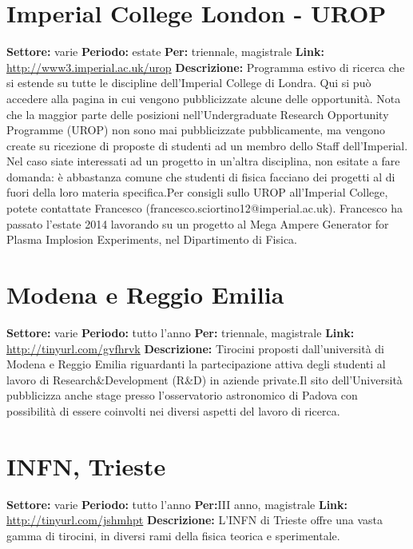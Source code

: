 \documentclass[a4paper,10pt]{article}
\begin{document}
\section{Imperial College London - UROP}

\textbf{Settore:} varie\newline
\textbf{Periodo:} estate\newline
\textbf{Per:} triennale, magistrale\newline
\textbf{Link:} \url{http://www3.imperial.ac.uk/urop} \newline
\textbf{Descrizione:}  Programma estivo di ricerca che si estende su tutte le discipline dell’Imperial College di Londra. Qui si può accedere alla pagina in cui vengono pubblicizzate alcune delle opportunità. Nota che la maggior parte delle posizioni nell'Undergraduate Research Opportunity Programme (UROP) non sono mai pubblicizzate pubblicamente, ma vengono create su ricezione di proposte di studenti ad un membro dello Staff dell'Imperial. Nel caso siate interessati ad un progetto in un’altra disciplina, non esitate a fare domanda: è abbastanza comune che studenti di fisica facciano dei progetti al di fuori della loro materia specifica.Per consigli sullo UROP all'Imperial College, potete contattate Francesco (francesco.sciortino12@imperial.ac.uk). Francesco ha passato l'estate 2014 lavorando su un progetto al Mega Ampere Generator for Plasma Implosion Experiments, nel Dipartimento di Fisica.   

\section{Modena e Reggio Emilia}
\textbf{Settore:} varie\newline
\textbf{Periodo:} tutto l'anno\newline
\textbf{Per:} triennale, magistrale\newline
\textbf{Link:} \url{http://tinyurl.com/gvfhrvk} \newline
\textbf{Descrizione:}  Tirocini proposti dall’università di Modena e Reggio Emilia riguardanti la partecipazione attiva degli studenti al lavoro di Research&Development (R&D) in aziende private.Il sito dell’Università pubblicizza anche stage presso l’osservatorio astronomico di Padova con possibilità di essere coinvolti nei diversi aspetti del lavoro di ricerca.  

\section{	INFN, Trieste}	
\textbf{Settore:} varie\newline
\textbf{Periodo:} tutto l'anno\newline
\textbf{Per:}III anno, magistrale\newline
\textbf{Link:} \url{http://tinyurl.com/jshmhpt} \newline
\textbf{Descrizione:} 	L’INFN di Trieste offre una vasta gamma di tirocini, in diversi rami della fisica teorica e sperimentale.	
\end{document}
